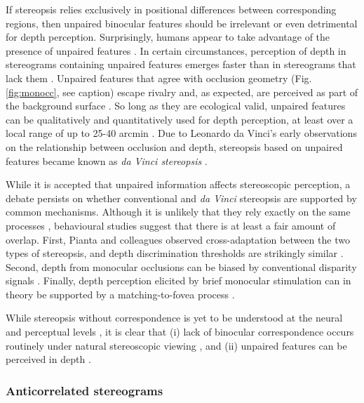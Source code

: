 If stereopsis relies exclusively in positional differences between corresponding regions, then unpaired binocular features should be irrelevant or even detrimental for depth perception. Surprisingly, humans appear to take advantage of the presence of unpaired features \cite{Gillam:1988lo, Shimojo:1988fk, Nakayama:1990fc, Shimojo:1990uq}. In certain circumstances, perception of depth in stereograms containing unpaired features emerges faster than in stereograms that lack them \cite{Gillam:1988lo}. Unpaired features that agree with occlusion geometry (Fig. \ref{fig:monocc}, see caption) escape rivalry and, as expected, are perceived as part of the background surface \cite{Shimojo:1990uq}. So long as they are ecological valid, unpaired features can be qualitatively and quantitatively used for depth perception, at least over a local range of up to 25-40 arcmin \cite{Nakayama:1990fc}. Due to Leonardo da Vinci's early observations on the relationship between occlusion and depth, stereopsis based on unpaired features became known as \textit{da Vinci stereopsis} \cite{Nakayama:1990fc}. 

While it is accepted that unpaired information affects stereoscopic perception, a debate persists on whether conventional and \textit{da Vinci} stereopsis are supported by common mechanisms. Although it is unlikely that they rely exactly on the same processes \cite{Gillam:2003bh,Tsirlin:2012ys}, behavioural studies suggest that there is at least a fair amount of overlap. First, Pianta and colleagues observed cross-adaptation between the two types of stereopsis, and depth discrimination thresholds are strikingly similar \cite{Pianta:2003mz}. Second, depth from monocular occlusions can be biased by conventional disparity signals \cite{Tsirlin:2011bd}. Finally, depth perception elicited by brief monocular stimulation \cite{Kaye:1978os} can in theory be supported by a matching-to-fovea process \cite{Wilcox:2007zt}.

While stereopsis without correspondence is yet to be understood at the neural and perceptual levels \cite{Harris:2009qf}, it is clear that (i) lack of binocular correspondence occurs routinely under natural stereoscopic viewing \cite{Lawson:1967dq,Nakayama:1990fc,Anderson:1994fk,Anderson:1994qc}, and (ii) unpaired features can be perceived in depth \cite{Nakayama:1990fc, Shimojo:1990uq}. 

\subsubsection{Anticorrelated stereograms} \label{sssec: ards}

